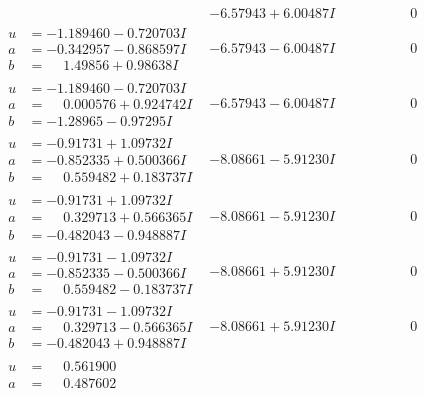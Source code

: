 \documentclass[1p]{elsarticle_modified}
\theoremstyle{definition}
\begin{document}
$$\begin{array}{c|c|c}
 & -6.57943 + 6.00487 I & \phantom{-0.000000 } 0 \\ \hline\begin{aligned}
u &= -1.189460 - 0.720703 I \\
a &= -0.342957 - 0.868597 I \\
b &= \phantom{-}1.49856 + 0.98638 I\end{aligned}
 & -6.57943 - 6.00487 I & \phantom{-0.000000 } 0 \\ \hline\begin{aligned}
u &= -1.189460 - 0.720703 I \\
a &= \phantom{-}0.000576 + 0.924742 I \\
b &= -1.28965 - 0.97295 I\end{aligned}
 & -6.57943 - 6.00487 I & \phantom{-0.000000 } 0 \\ \hline\begin{aligned}
u &= -0.91731 + 1.09732 I \\
a &= -0.852335 + 0.500366 I \\
b &= \phantom{-}0.559482 + 0.183737 I\end{aligned}
 & -8.08661 - 5.91230 I & \phantom{-0.000000 } 0 \\ \hline\begin{aligned}
u &= -0.91731 + 1.09732 I \\
a &= \phantom{-}0.329713 + 0.566365 I \\
b &= -0.482043 - 0.948887 I\end{aligned}
 & -8.08661 - 5.91230 I & \phantom{-0.000000 } 0 \\ \hline\begin{aligned}
u &= -0.91731 - 1.09732 I \\
a &= -0.852335 - 0.500366 I \\
b &= \phantom{-}0.559482 - 0.183737 I\end{aligned}
 & -8.08661 + 5.91230 I & \phantom{-0.000000 } 0 \\ \hline\begin{aligned}
u &= -0.91731 - 1.09732 I \\
a &= \phantom{-}0.329713 - 0.566365 I \\
b &= -0.482043 + 0.948887 I\end{aligned}
 & -8.08661 + 5.91230 I & \phantom{-0.000000 } 0 \\ \hline\begin{aligned}
u &= \phantom{-}0.561900\phantom{ +0.000000I} \\
a &= \phantom{-}0.487602\phantom{ +0.000000I} \\

\end{aligned}
\end{array}$$
\end{document}
